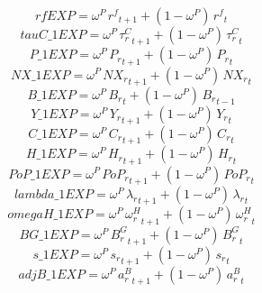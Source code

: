 \begin{dmath*}
rfEXP = {{\omega^{P}}}\, {{r^{f}}}_{t+1}+\left(1-{{\omega^{P}}}\right)\, {{r^{f}}}_{t}
\end{dmath*}
\begin{dmath*}
tauC\_1EXP = {{\omega^{P}}}\, {{\tau^{C}_{r}}}_{t+1}+\left(1-{{\omega^{P}}}\right)\, {{\tau^{C}_{r}}}_{t}
\end{dmath*}
\begin{dmath*}
P\_1EXP = {{\omega^{P}}}\, {{P_{r}}}_{t+1}+\left(1-{{\omega^{P}}}\right)\, {{P_{r}}}_{t}
\end{dmath*}
\begin{dmath*}
NX\_1EXP = {{\omega^{P}}}\, {{NX_r}}_{t+1}+\left(1-{{\omega^{P}}}\right)\, {{NX_r}}_{t}
\end{dmath*}
\begin{dmath*}
B\_1EXP = {{\omega^{P}}}\, {{B_r}}_{t}+\left(1-{{\omega^{P}}}\right)\, {{B_r}}_{t-1}
\end{dmath*}
\begin{dmath*}
Y\_1EXP = {{\omega^{P}}}\, {{Y_r}}_{t+1}+\left(1-{{\omega^{P}}}\right)\, {{Y_r}}_{t}
\end{dmath*}
\begin{dmath*}
C\_1EXP = {{\omega^{P}}}\, {{C_r}}_{t+1}+\left(1-{{\omega^{P}}}\right)\, {{C_r}}_{t}
\end{dmath*}
\begin{dmath*}
H\_1EXP = {{\omega^{P}}}\, {{H_r}}_{t+1}+\left(1-{{\omega^{P}}}\right)\, {{H_r}}_{t}
\end{dmath*}
\begin{dmath*}
PoP\_1EXP = {{\omega^{P}}}\, {{PoP_r}}_{t+1}+\left(1-{{\omega^{P}}}\right)\, {{PoP_r}}_{t}
\end{dmath*}
\begin{dmath*}
lambda\_1EXP = {{\omega^{P}}}\, {\lambda_r}_{t+1}+\left(1-{{\omega^{P}}}\right)\, {\lambda_r}_{t}
\end{dmath*}
\begin{dmath*}
omegaH\_1EXP = {{\omega^{P}}}\, {{\omega^H_r}}_{t+1}+\left(1-{{\omega^{P}}}\right)\, {{\omega^H_r}}_{t}
\end{dmath*}
\begin{dmath*}
BG\_1EXP = {{\omega^{P}}}\, {{B^G_{r}}}_{t+1}+\left(1-{{\omega^{P}}}\right)\, {{B^G_{r}}}_{t}
\end{dmath*}
\begin{dmath*}
s\_1EXP = {{\omega^{P}}}\, {{s_r}}_{t+1}+\left(1-{{\omega^{P}}}\right)\, {{s_r}}_{t}
\end{dmath*}
\begin{dmath*}
adjB\_1EXP = {{\omega^{P}}}\, {a^B_r}_{t+1}+\left(1-{{\omega^{P}}}\right)\, {a^B_r}_{t}
\end{dmath*}

